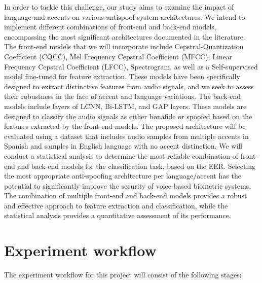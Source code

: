 In order to tackle this challenge, our study aims to examine the impact of language and accents on various antispoof system architectures. We intend to implement different combinations of front-end and back-end models, encompassing the most significant architectures documented in the literature. The front-end models that we will incorporate include Cepstral-Quantization Coefficient (CQCC), Mel Frequency Cepstral Coefficient (MFCC), Linear Frequency Cepstral Coefficient (LFCC), Spectrogram, as well as a Self-supervised model fine-tuned for feature extraction. These models have been specifically designed to extract distinctive features from audio signals, and we seek to assess their robustness in the face of accent and language variations. The back-end models include layers of \acs{LCNN}, \acs{Bi-LSTM}, and \acs{GAP} layers. These models are designed to classify the audio signals as either bonafide or spoofed based on the features extracted by the front-end models. The proposed architecture will be evaluated using a dataset that includes audio samples from multiple accents in Spanish and samples in English language with no accent distinction. We will conduct a statistical analysis to determine the most reliable combination of front-end and back-end models for the classification task, based on the \acs{EER}. Selecting the most appropriate anti-spoofing architecture per language/accent has the potential to significantly improve the security of voice-based biometric systems. The combination of multiple front-end and back-end models provides a robust and effective approach to feature extraction and classification, while the statistical analysis provides a quantitative assessment of its performance.

\section{Experiment workflow}

The experiment workflow for this project will consist of the following stages:

